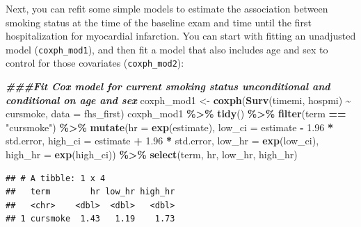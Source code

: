 \documentclass[
]{book}
\newenvironment{Shaded}{\begin{snugshade}}{\end{snugshade}}
\newcommand{\AttributeTok}[1]{\textcolor[rgb]{0.13,0.29,0.53}{#1}}
\newcommand{\DocumentationTok}[1]{\textcolor[rgb]{0.56,0.35,0.01}{\textbf{\textit{#1}}}}
\newcommand{\FloatTok}[1]{\textcolor[rgb]{0.00,0.00,0.81}{#1}}
\newcommand{\FunctionTok}[1]{\textcolor[rgb]{0.13,0.29,0.53}{\textbf{#1}}}
\newcommand{\NormalTok}[1]{#1}
\newcommand{\OtherTok}[1]{\textcolor[rgb]{0.56,0.35,0.01}{#1}}
\newcommand{\SpecialCharTok}[1]{\textcolor[rgb]{0.81,0.36,0.00}{\textbf{#1}}}
\newcommand{\StringTok}[1]{\textcolor[rgb]{0.31,0.60,0.02}{#1}}
\begin{document}
Next, you can refit some simple models to estimate the association between smoking status at the time of the baseline exam and time until the first hospitalization for myocardial infarction. You can start with fitting an unadjusted model (\texttt{coxph\_mod1}), and then fit a model that also includes age and sex to control for those covariates (\texttt{coxph\_mod2}):

\begin{Shaded}
\begin{Highlighting}[]
\DocumentationTok{\#\#\#Fit Cox model for current smoking status unconditional and conditional on age and sex}
\NormalTok{coxph\_mod1 }\OtherTok{\textless{}{-}} \FunctionTok{coxph}\NormalTok{(}\FunctionTok{Surv}\NormalTok{(timemi, hospmi) }\SpecialCharTok{\textasciitilde{}}\NormalTok{ cursmoke, }
                    \AttributeTok{data =}\NormalTok{ fhs\_first)}
\NormalTok{coxph\_mod1 }\SpecialCharTok{\%\textgreater{}\%} 
  \FunctionTok{tidy}\NormalTok{() }\SpecialCharTok{\%\textgreater{}\%} 
  \FunctionTok{filter}\NormalTok{(term }\SpecialCharTok{==} \StringTok{"cursmoke"}\NormalTok{) }\SpecialCharTok{\%\textgreater{}\%} 
  \FunctionTok{mutate}\NormalTok{(}\AttributeTok{hr =} \FunctionTok{exp}\NormalTok{(estimate),}
         \AttributeTok{low\_ci =}\NormalTok{ estimate }\SpecialCharTok{{-}} \FloatTok{1.96} \SpecialCharTok{*}\NormalTok{ std.error, }
         \AttributeTok{high\_ci =}\NormalTok{ estimate }\SpecialCharTok{+} \FloatTok{1.96} \SpecialCharTok{*}\NormalTok{ std.error, }
         \AttributeTok{low\_hr =} \FunctionTok{exp}\NormalTok{(low\_ci), }
         \AttributeTok{high\_hr =} \FunctionTok{exp}\NormalTok{(high\_ci)) }\SpecialCharTok{\%\textgreater{}\%} 
  \FunctionTok{select}\NormalTok{(term, hr, low\_hr, high\_hr)}
\end{Highlighting}
\end{Shaded}

\begin{verbatim}
## # A tibble: 1 x 4
##   term        hr low_hr high_hr
##   <chr>    <dbl>  <dbl>   <dbl>
## 1 cursmoke  1.43   1.19    1.73
\end{verbatim}
\end{document}

